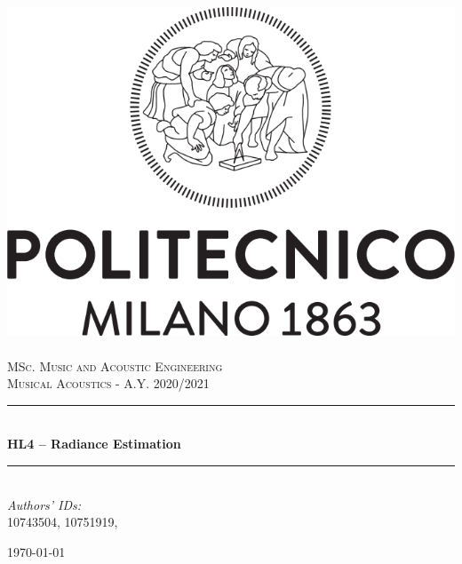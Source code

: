 \documentclass[a4paper]{article}
\title{}
\author{}
\begin{document}
\begin{titlepage}	
	\newcommand{\HRule}{\rule{\linewidth}{0.5mm}} %
	
	\center %
	
	
	\includegraphics[width=.4\textwidth]{Logo_Politecnico_Milano.png}\\[0.4cm]
	\textsc{\LARGE}\\[0.3cm] %
	
	\textsc{\large MSc. Music and Acoustic Engineering}\\[1cm] %
	
	\textsc{\Large Musical Acoustics - A.Y. 2020/2021}\\[0.5cm] %
	
	
	\HRule\\[0.4cm]
	
	{\huge\bfseries HL4 – Radiance Estimation}\\[0.4cm] %
	
	\HRule\\[1.5cm]
	
	
	
	{\large\textit{Authors' IDs:}}\\
	10743504, 10751919, %
	
	
	\vfill\vfill\vfill %
	
	{\large\today} %
	
	
	\vfill\vfill
	
	
	\vfill %
	
	
\end{titlepage}
\end{document}
